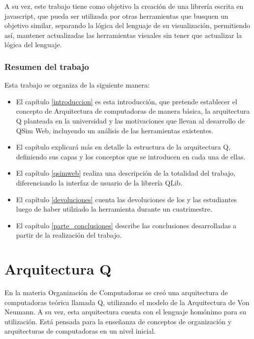 A su vez, este trabajo tiene como objetivo la creación de una librería escrita en javascript, que pueda ser utilizada por otras herramientas que busquen un objetivo similar, separando la lógica del lenguaje de su visualización, permitiendo así, mantener actualizadas las herramientas visuales sin tener que actualizar la lógica del lenguaje.


\section{Resumen del trabajo}

\label{resumen}

Esta trabajo se organiza de la siguiente manera:

\begin{itemize}
\item El capítulo \ref{introduccion} es esta introducción, que pretende establecer el concepto de Arquitectura de computadoras de manera básica,
la arquitectura Q planteada en la universidad y las motivaciones que llevan al desarrollo de QSim Web, incluyendo un análisis de las herramientas existentes.

\item El capítulo \ref{arquitectura-q} explicará más en detalle la estructura de la arquitectura Q, definiendo sus capas y los conceptos
que se introducen en cada una de ellas.

\item El capítulo \ref{qsimweb} realiza una descripción de la totalidad del trabajo, diferenciando la interfaz de usuario de la librería QLib.
\item El capítulo \ref{devoluciones} cuenta las devoluciones de los y las estudiantes luego de haber utilziado la herramienta durante un cuatrimestre.
\item El capítulo \ref{parte_conclusiones} describe las conclusiones desarrolladas a partir de la realización del trabajo.

\end{itemize}

\part{Arquitectura Q}
\label{arquitectura-q}
En la materia Organización de Computadoras se creó una arquitectura de computadoras teórica llamada Q, utilizando el modelo de la Arquitectura de Von Neumann. 
A su vez, esta arquitectura cuenta con el lenguaje homónimo para su utilización. Está pensada para la enseñanza de conceptos de organización y arquitecturas de computadoras
en un nivel inicial.

